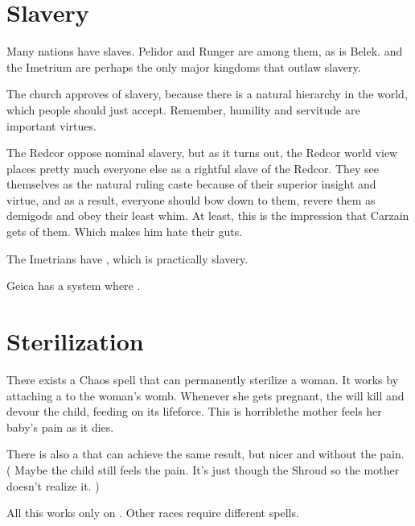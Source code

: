 \section{Slavery}
Many nations have slaves. Pelidor and Runger are among them, as is Belek. 
\Redce{} and the Imetrium are perhaps the only major kingdoms that outlaw slavery. 

The \Velcadian{} church approves of slavery, because there is a natural hierarchy in the world, which people should just accept. Remember, humility and servitude are important  virtues. 

The Redcor oppose nominal slavery, but as it turns out, the Redcor world view places pretty much everyone else as a rightful slave of the Redcor. They see themselves as the natural ruling caste because of their superior insight and virtue, and as a result, everyone should bow down to them, revere them as demigods and obey their least whim. At least, this is the impression that Carzain gets of them. Which makes him hate their guts. 

The Imetrians have , which is practically slavery. 

Geica has a system where . 















\section{Sterilization}
There exists a Chaos spell that can permanently sterilize a \human{} woman. 
It works by attaching a  to the woman's womb. 
Whenever she gets pregnant, the \daemon{} will kill and devour the child, feeding on its lifeforce. 
This is horrible\dash the mother feels her baby's pain as it dies. 

There is also a \qliphah{} that can achieve the same result, but nicer and without the pain. 
(%
  Maybe the child still feels the pain. 
  It's just  though the \Itzach{} Shroud so the mother doesn't realize it.%
) 

All this works only on \humans{}. 
Other races require different spells. 























